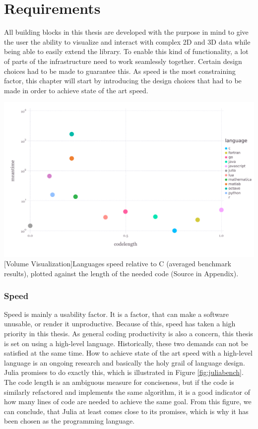 \section{Requirements}

All building blocks in this thesis are developed with the purpose in mind to give the user the ability to visualize and interact with complex 2D and 3D data while being able to easily extend the library.
To enable this kind of functionality, a lot of parts of the infrastructure need to work seamlessly together.
Certain design choices had to be made to guarantee this. As speed is the most constraining factor, this chapter will start by introducing the design choices that had to be made in order to achieve state of the art speed.

\vspace{1em}
\begin{minipage}{\linewidth}
    \centering
    \includegraphics[width=0.9\linewidth]{graphics/julia_bench.pdf}
    [Volume Visualization]{Languages speed relative to C (averaged benchmark results), plotted against the length of the needed code (Source in Appendix).}
    \label{fig:juliabench}
\end{minipage}


\subsubsection{Speed}
Speed is mainly a usability factor. It is a factor, that can make a software unusable, or render it unproductive. Because of this, speed has taken a high priority in this thesis. 
As general coding productivity is also a concern, this thesis is set on using a high-level language.
Historically, these two demands can not be satisfied at the same time.
How to achieve state of the art speed with a high-level language is an ongoing research and basically the holy grail of language design. 
Julia promises to do exactly this, which is illustrated in Figure \ref{fig:juliabench}. 
The code length is an ambiguous measure for conciseness, but if the code is similarly refactored and implements the same algorithm, it is a good indicator of how many lines of code are needed to achieve the same goal.
From this figure, we can conclude, that Julia at least comes close to its promises, which is why it has been chosen as the programming language.

